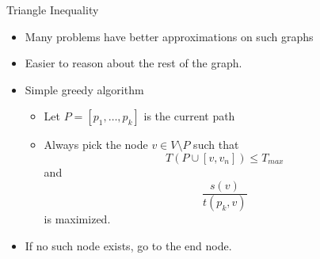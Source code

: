 \begin{frame}{Triangle Inequality}


	\begin{itemize}
		\item<2> Many problems have better approximations on such graphs \cite{black_triangle_2004}
		\item<2> Easier to reason about the rest of the graph.
		\item<3-> Simple greedy algorithm \begin{itemize}
			\item<4-> Let $P = [p_1, \dots, p_k]$ is the current path
			\item<4-> Always pick the node $v \in V \setminus P$ such that
			\begin{equation*}
				T(P \cup [v, v_n]) \leq T_{max}
			\end{equation*}
			and
			\begin{equation*}
				\frac{s(v)}{t(p_k, v)}
			\end{equation*}
			is maximized.
		\end{itemize}
		\item<4-> If no such node exists, go to the end node.
	\end{itemize}
\end{frame}

